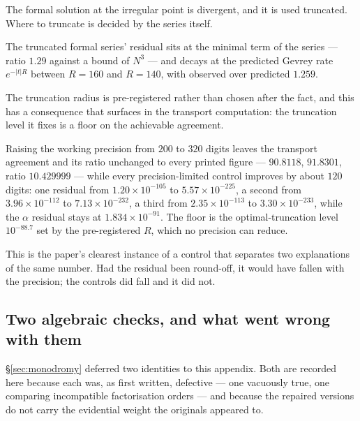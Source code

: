 The formal solution at the irregular point is divergent, and it is used
truncated. Where to truncate is decided by the series itself.

\begin{remark}
The truncated formal series' residual sits at the minimal term of the series
--- ratio $1.29$ against a bound of $N^{3}$ --- and decays at the predicted
Gevrey rate $e^{-|t|R}$ between $R=160$ and $R=140$, with observed over
predicted $1.259$.
\end{remark}

The truncation radius is pre-registered rather than chosen after the fact, and
this has a consequence that surfaces in the transport computation: the
truncation level it fixes is a floor on the achievable agreement.

\begin{remark}
Raising the working precision from $200$ to $320$ digits leaves the transport
agreement and its ratio unchanged to every printed figure --- $90.8118$,
$91.8301$, ratio $10.429999$ --- while every precision-limited control improves
by about $120$ digits: one residual from $1.20\times10^{-105}$ to
$5.57\times10^{-225}$, a second from $3.96\times10^{-112}$ to
$7.13\times10^{-232}$, a third from $2.35\times10^{-113}$ to
$3.30\times10^{-233}$, while the $\alpha$ residual stays at
$1.834\times10^{-91}$. The floor is the optimal-truncation level
$10^{-88.7}$ set by the pre-registered $R$, which no precision can reduce.
\end{remark}

This is the paper's clearest instance of a control that separates two
explanations of the same number. Had the residual been round-off, it would have
fallen with the precision; the controls did fall and it did not.

\subsection{Two algebraic checks, and what went wrong with them}\label{ssec:methods-algebra}

\S\ref{sec:monodromy} deferred two identities to this appendix. Both are
recorded here because each was, as first written, defective --- one vacuously
true, one comparing incompatible factorisation orders --- and because the
repaired versions do not carry the evidential weight the originals appeared to.

